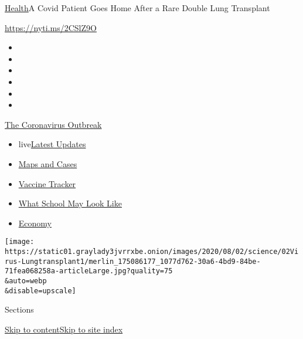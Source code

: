 \href{/section/health}{Health}\textbar{}A Covid Patient Goes Home After
a Rare Double Lung Transplant

\url{https://nyti.ms/2CSlZ9O}

\begin{itemize}
\item
\item
\item
\item
\item
\item
\end{itemize}

\href{https://www.nytimes3xbfgragh.onion/news-event/coronavirus?action=click\&pgtype=Article\&state=default\&region=TOP_BANNER\&context=storylines_menu}{The
Coronavirus Outbreak}

\begin{itemize}
\tightlist
\item
  live\href{https://www.nytimes3xbfgragh.onion/2020/08/02/world/coronavirus-updates.html?action=click\&pgtype=Article\&state=default\&region=TOP_BANNER\&context=storylines_menu}{Latest
  Updates}
\item
  \href{https://www.nytimes3xbfgragh.onion/interactive/2020/us/coronavirus-us-cases.html?action=click\&pgtype=Article\&state=default\&region=TOP_BANNER\&context=storylines_menu}{Maps
  and Cases}
\item
  \href{https://www.nytimes3xbfgragh.onion/interactive/2020/science/coronavirus-vaccine-tracker.html?action=click\&pgtype=Article\&state=default\&region=TOP_BANNER\&context=storylines_menu}{Vaccine
  Tracker}
\item
  \href{https://www.nytimes3xbfgragh.onion/interactive/2020/07/29/us/schools-reopening-coronavirus.html?action=click\&pgtype=Article\&state=default\&region=TOP_BANNER\&context=storylines_menu}{What
  School May Look Like}
\item
  \href{https://www.nytimes3xbfgragh.onion/live/2020/07/31/business/stock-market-today-coronavirus?action=click\&pgtype=Article\&state=default\&region=TOP_BANNER\&context=storylines_menu}{Economy}
\end{itemize}

\texttt{[image: https://static01.graylady3jvrrxbe.onion/images/2020/08/02/science/02Virus-Lungtransplant1/merlin\_175086177\_1077d762-30a6-4bd9-84be-71fea068258a-articleLarge.jpg?quality=75\\\&auto=webp\\\&disable=upscale]}

Sections

\protect\hyperlink{site-content}{Skip to
content}\protect\hyperlink{site-index}{Skip to site index}

